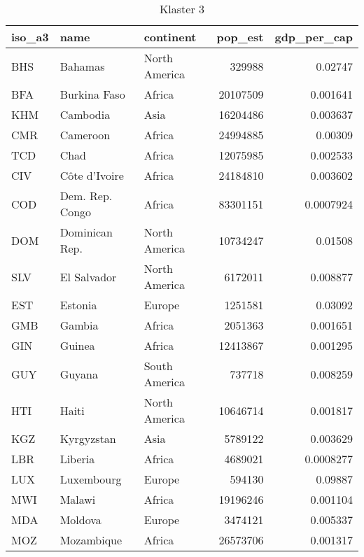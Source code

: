 \begin{table}[h!]
   \centering
   \caption{Klaster 3}
   \label{tab:cl3}
   \begin{tabular}{lllrr}
      \toprule
      iso\_a3 & name            & continent     & pop\_est & gdp\_per\_cap \\
      \midrule
      BHS     & Bahamas         & North America & 329988   & 0.02747       \\
      BFA     & Burkina Faso    & Africa        & 20107509 & 0.001641      \\
      KHM     & Cambodia        & Asia          & 16204486 & 0.003637      \\
      CMR     & Cameroon        & Africa        & 24994885 & 0.00309       \\
      TCD     & Chad            & Africa        & 12075985 & 0.002533      \\
      CIV     & Côte d'Ivoire   & Africa        & 24184810 & 0.003602      \\
      COD     & Dem. Rep. Congo & Africa        & 83301151 & 0.0007924     \\
      DOM     & Dominican Rep.  & North America & 10734247 & 0.01508       \\
      SLV     & El Salvador     & North America & 6172011  & 0.008877      \\
      EST     & Estonia         & Europe        & 1251581  & 0.03092       \\
      GMB     & Gambia          & Africa        & 2051363  & 0.001651      \\
      GIN     & Guinea          & Africa        & 12413867 & 0.001295      \\
      GUY     & Guyana          & South America & 737718   & 0.008259      \\
      HTI     & Haiti           & North America & 10646714 & 0.001817      \\
      KGZ     & Kyrgyzstan      & Asia          & 5789122  & 0.003629      \\
      LBR     & Liberia         & Africa        & 4689021  & 0.0008277     \\
      LUX     & Luxembourg      & Europe        & 594130   & 0.09887       \\
      MWI     & Malawi          & Africa        & 19196246 & 0.001104      \\
      MDA     & Moldova         & Europe        & 3474121  & 0.005337      \\
      MOZ     & Mozambique      & Africa        & 26573706 & 0.001317      \\

\end{tabular}
\end{table}
